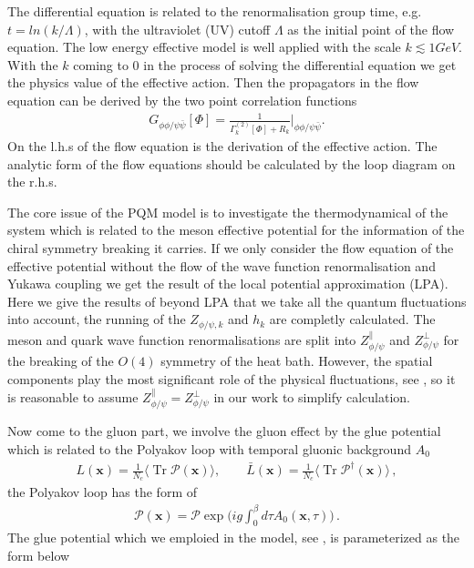 \documentclass[%
reprint,
superscriptaddress,
showpacs,preprintnumbers,
 amsmath,amssymb,
 aps,
prd,
]{revtex4-1}
\newcommand{\Tr}{\ensuremath{\operatorname{Tr}}}
\begin{document}
The differential equation is related to the renormalisation group time, e.g. $t=ln(k/\Lambda)$, with the ultraviolet (UV) cutoff $\Lambda$ as the initial point of the flow equation. The low energy effective model is well applied with the scale $k\lesssim 1GeV$. With the $k$ coming to $0$ in the process of solving the differential equation we get the physics value of the effective action. Then the propagators in the flow equation can be derived by the two point correlation functions
\begin{align}
G_{\phi\phi/\psi\bar{\psi}}[\Phi]=\frac{1}{\Gamma^{(2)}_k[\Phi]+R_k}\bigg|_{\phi\phi/\psi\bar{\psi}}.
\end{align}
On the l.h.s of the flow equation is the derivation of the effective action. The analytic form of the flow equations should be calculated by the loop diagram on the r.h.s.\par
The core issue of the PQM model is to investigate the thermodynamical of the system which is related to the meson effective potential for the information of the chiral symmetry breaking it carries. If we only consider the flow equation of the effective potential without the flow of the wave function renormalisation and Yukawa coupling we get the result of the local potential approximation (LPA). Here we give the results of beyond LPA that we take all the quantum fluctuations into account, the running of the $Z_{\phi/\psi,k}$ and $h_{k}$ are completly calculated. The meson and quark wave function renormalisations are split into $Z^{\|}_{\phi/\psi}$ and $Z^{\bot}_{\phi/\psi}$ for the breaking of the $O(4)$ symmetry of the heat bath. However, the spatial components play the most significant role of the physical fluctuations, see \cite{Yin:2019ebz}, so it is reasonable to assume $Z^{\|}_{\phi/\psi}=Z^{\bot}_{\phi/\psi}$ in our work to simplify calculation. \par
Now come to the gluon part, we involve the gluon effect by the glue potential which is related to the Polyakov loop with temporal gluonic background $A_0$
\begin{align}
L(\bm x)=\frac{1}{N_c}\langle \Tr{\mathcal{P}(\bm x)} \rangle ,\qquad \bar{L} (\bm x)=\frac{1}{N_c}\langle \Tr{\mathcal{P}^{\dagger}(\bm x)} \rangle\,,\label{}
\end{align}
the Polyakov loop has the form of
\begin{align}
\mathcal{P}(\bm x)=\mathcal{P}\exp\bigg( ig\int_{0}^{\beta}d\tau A_0(\bm x,\tau) \bigg)\,.\label{}
\end{align}
The glue potential which we emploied in the model, see \cite{Lo:2013hla}, is parameterized as the form below
\end{document}
